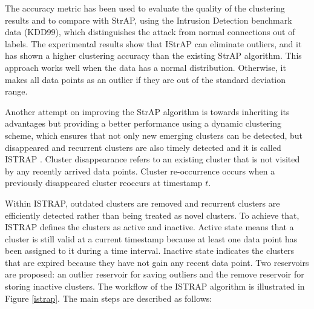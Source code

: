 
The accuracy metric has been used to evaluate the quality of the clustering results and to compare with StrAP, using the Intrusion Detection benchmark data (KDD99), which distinguishes the attack from normal connections out of labels.   
The experimental results show that IStrAP can eliminate outliers, and it has shown a higher clustering accuracy than the existing StrAP algorithm. 
This approach works well when the data has a normal distribution. Otherwise, it makes all data points as an outlier if they are out of the standard deviation range.



Another attempt on improving the StrAP algorithm is towards inheriting its advantages but providing a better performance using a dynamic clustering scheme, which ensures that not only new emerging clusters can be detected, but disappeared and recurrent clusters are also timely detected and it is called ISTRAP \cite{sui2018dynamic}. Cluster disappearance refers to an existing cluster that is not visited by any recently arrived data points. Cluster re-occurrence occurs when a previously disappeared cluster reoccurs at timestamp $t$. 

Within ISTRAP, outdated clusters are removed and recurrent clusters are efficiently detected rather than being treated as novel clusters. To achieve that, ISTRAP defines the clusters as active and inactive. Active state means that a cluster is still valid at a current timestamp because at least one data point has been assigned to it during a time interval. Inactive state indicates the clusters that are expired because they have not gain any recent data point. Two reservoirs are proposed: an outlier reservoir for saving outliers and the remove reservoir for storing inactive clusters. The workflow of the ISTRAP algorithm is illustrated in Figure \ref{istrap}. The main steps are described as follows:

